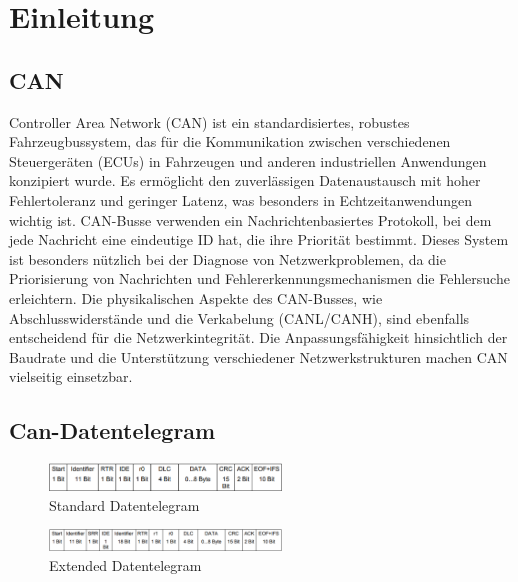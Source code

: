 \chapter{Einleitung}
\label{sec:Einleitung}

\section{CAN}
Controller Area Network (CAN) ist ein standardisiertes, robustes Fahrzeugbussystem, das für die Kommunikation zwischen verschiedenen Steuergeräten (ECUs) in Fahrzeugen und anderen industriellen Anwendungen konzipiert wurde. Es ermöglicht den zuverlässigen Datenaustausch mit hoher Fehlertoleranz und geringer Latenz, was besonders in Echtzeitanwendungen wichtig ist. CAN-Busse verwenden ein Nachrichtenbasiertes Protokoll, bei dem jede Nachricht eine eindeutige ID hat, die ihre Priorität bestimmt. Dieses System ist besonders nützlich bei der Diagnose von Netzwerkproblemen, da die Priorisierung von Nachrichten und Fehlererkennungsmechanismen die Fehlersuche erleichtern. Die physikalischen Aspekte des CAN-Busses, wie Abschlusswiderstände und die Verkabelung (CANL/CANH), sind ebenfalls entscheidend für die Netzwerkintegrität. Die Anpassungsfähigkeit hinsichtlich der Baudrate und die Unterstützung verschiedener Netzwerkstrukturen machen CAN vielseitig einsetzbar.\\

\section{Can-Datentelegram}
\begin{figure}[h]
    \centering
    \includegraphics[width = 0.55\textwidth]{img/standard_datenframe.png}
    \caption{Standard Datentelegram}
    \label{fig: Standard Datentelegram}
\end{figure}
\begin{figure}[h]
    \centering
    \includegraphics[width = 0.55\textwidth]{img/extended_datenframe.png}
    \caption{Extended Datentelegram}
    \label{fig: Extended Datentelegram}
\end{figure}

